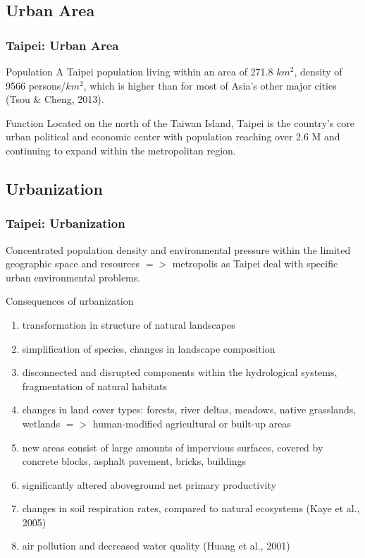 \documentclass[pdflatex,compress,8pt,
	xcolor={dvipsnames,dvipsnames,svgnames,x11names,table},
	hyperref={	
	breaklinks = true, 
	pdfauthor={Lemenkova Polina}, 
	pdfsubject={Preentation}, 
	pdfcreator={Lemenkova Polina}, 
	pdfproducer={Lemenkova Polina}, 
	colorlinks=true,
	linkcolor=Gold1, 
	citecolor=NavyBlue, 
	urlcolor = NavyBlue, 
	breaklinks = true}]{beamer}
\begin{document}
\subsection{Urban Area}
\begin{frame}\frametitle{Taipei: Urban Area}
\begin{figure}[H]
	\centering
			\hspace{5mm}
\end{figure}

\begin{alertblock}{Population}
A Taipei population living within an area of 271.8 $km^{2}$, density of 9566 persons/$km^{2}$, which is higher than for most of Asia’s other major cities (Tsou \& Cheng, 2013).
\end{alertblock}

\begin{block}{Function}
Located on the north of the Taiwan Island, Taipei is the country's core urban \alert{political and economic center} with population reaching over 2.6 M and continuing to expand within the metropolitan region.
\end{block}

\end{frame}

\subsection{Urbanization}
\begin{frame}\frametitle{Taipei: Urbanization}
Concentrated \alert{population density} and \alert{environmental pressure} within the \alert{limited geographic space and resources} $=>$ metropolis as Taipei deal with specific urban environmental problems.
\begin{examples}{Consequences of urbanization}
\begin{enumerate}
	\item transformation in \alert{structure of natural landscapes}
	\item simplification of species, changes in landscape composition
	\item disconnected and disrupted components within the hydrological systems, fragmentation of natural habitats
	\item changes in \alert{land cover types}: forests, river deltas, meadows, native grasslands, wetlands $=>$ human-modified agricultural or \alert{built-up areas} 
	\item new areas consist of large amounts of \alert{impervious surfaces}, covered by concrete blocks, asphalt pavement, bricks, buildings
	\item significantly altered \alert{aboveground net primary productivity}
	\item changes in \alert{soil respiration rates}, compared to natural ecosystems (Kaye et al., 2005)
	\item \alert{air pollution} and decreased \alert{water quality} (Huang et al., 2001)
\end{enumerate}
\end{examples}
\end{frame}
\end{document}
